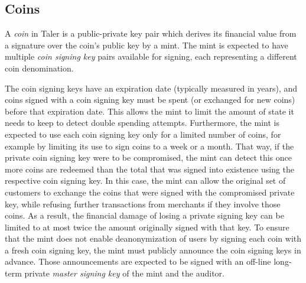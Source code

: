 \documentclass{llncs}
\begin{document}


\subsection{Coins}

A \emph{coin} in Taler is a public-private key pair which derives its
financial value from a signature over the coin's public key by a mint.
The mint is expected to have multiple {\em coin signing key} pairs
available for signing, each representing a different coin
denomination.

The coin signing keys have an expiration date (typically measured in
years), and coins signed with a coin signing key must be spent (or
exchanged for new coins) before that expiration date.  This allows the
mint to limit the amount of state it needs to keep to detect
double spending attempts.  Furthermore, the mint is expected to use each coin
signing key only for a limited number of coins, for example by
limiting its use to sign coins to a week or a month.  That way, if the
private coin signing key were to be compromised, the mint can detect
this once more coins are redeemed than the total that was signed into
existence using the respective coin signing key.  In this case, the
mint can allow the original set of customers to exchange the coins
that were signed with the compromised private key, while refusing
further transactions from merchants if they involve those coins.  As a
result, the financial damage of losing a private signing key can be
limited to at most twice the amount originally signed with that key.
To ensure that the mint does not enable deanonymization of users by
signing each coin with a fresh coin signing key, the mint must
publicly announce the coin signing keys in advance.  Those
announcements are expected to be signed with an off-line long-term
private {\em master signing key} of the mint and the auditor.
\end{document}
